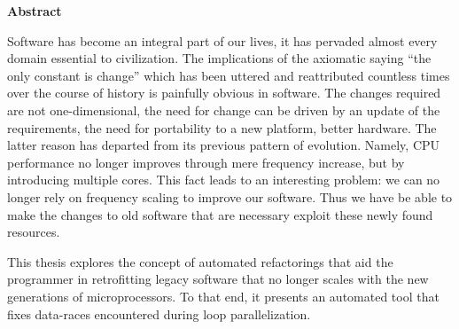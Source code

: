 \begin{alwayssingle} 
\pagestyle{empty}
\begin{center}
\vspace*{1.5cm}
{\Large \bfseries  Abstract}
\end{center}
\vspace{0.5cm}

Software has become an integral part of our lives, it has pervaded almost every
domain essential to civilization. The implications of the axiomatic saying ``the
only constant is change'' which has been uttered and reattributed countless
times over the course of history is painfully obvious in software. The changes
required are not one-dimensional, the need for change can be driven by an update
of the requirements, the need for portability to a new platform, better
hardware. The latter reason has departed from its previous pattern of evolution.
Namely, CPU performance no longer improves through mere frequency increase, but
by introducing multiple cores. This fact leads to an interesting problem: we can
no longer rely on frequency scaling to improve our software. Thus we have be
able to make the changes to old software  that are necessary exploit these newly
found resources.

This thesis explores the concept of automated refactorings that aid the
programmer in retrofitting legacy software that no longer scales with the new
generations of microprocessors. To that end, it presents an automated tool that
fixes data-races encountered during loop parallelization.

\end{alwayssingle}